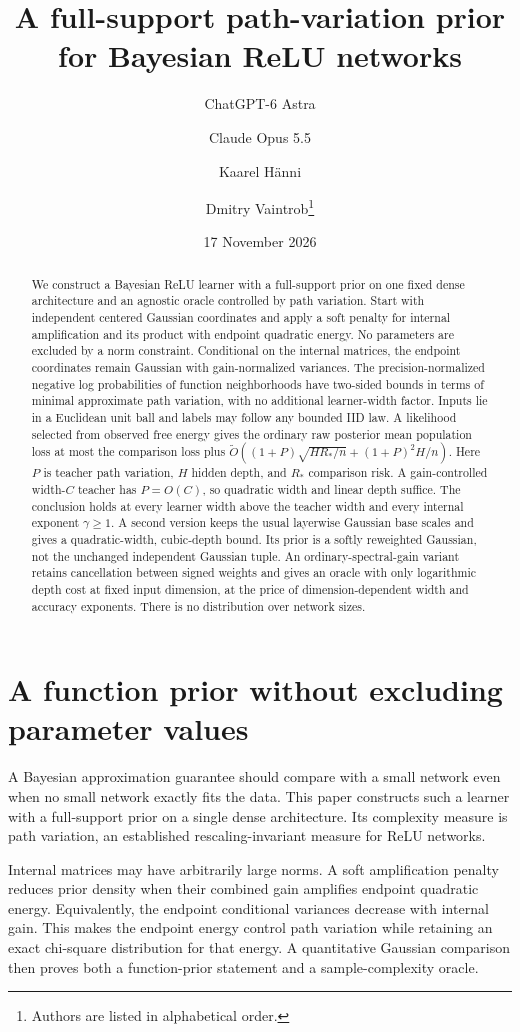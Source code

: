 \documentclass[11pt]{article}
\title{A full-support path-variation prior\\for Bayesian ReLU networks}
\author{ChatGPT-6 Astra \and Claude Opus 5.5 \and Kaarel H\"anni \and Dmitry Vaintrob\thanks{Authors are listed in alphabetical order.}}
\date{17 November 2026}
\theoremstyle{definition}\newtheorem{definition}[theorem]{Definition}
\theoremstyle{remark}\newtheorem{remark}[theorem]{Remark}
\begin{document}
\maketitle
\begin{abstract}
We construct a Bayesian ReLU learner with a full-support prior on one fixed dense architecture and an agnostic oracle controlled by path variation. Start with independent centered Gaussian coordinates and apply a soft penalty for internal amplification and its product with endpoint quadratic energy. No parameters are excluded by a norm constraint. Conditional on the internal matrices, the endpoint coordinates remain Gaussian with gain-normalized variances. The precision-normalized negative log probabilities of function neighborhoods have two-sided bounds in terms of minimal approximate path variation, with no additional learner-width factor. Inputs lie in a Euclidean unit ball and labels may follow any bounded IID law. A likelihood selected from observed free energy gives the ordinary raw posterior mean population loss at most the comparison loss plus $\widetilde O((1+P)\sqrt{HR_*/n}+(1+P)^2H/n)$. Here $P$ is teacher path variation, $H$ hidden depth, and $R_*$ comparison risk. A gain-controlled width-$C$ teacher has $P=O(C)$, so quadratic width and linear depth suffice. The conclusion holds at every learner width above the teacher width and every internal exponent $\gamma\ge1$. A second version keeps the usual layerwise Gaussian base scales and gives a quadratic-width, cubic-depth bound. Its prior is a softly reweighted Gaussian, not the unchanged independent Gaussian tuple. An ordinary-spectral-gain variant retains cancellation between signed weights and gives an oracle with only logarithmic depth cost at fixed input dimension, at the price of dimension-dependent width and accuracy exponents. There is no distribution over network sizes.
\end{abstract}

\section{A function prior without excluding parameter values}
A Bayesian approximation guarantee should compare with a small network even when no small network exactly fits the data. This paper constructs such a learner with a full-support prior on a single dense architecture. Its complexity measure is path variation, an established rescaling-invariant measure for ReLU networks.

Internal matrices may have arbitrarily large norms. A soft amplification penalty reduces prior density when their combined gain amplifies endpoint quadratic energy. Equivalently, the endpoint conditional variances decrease with internal gain. This makes the endpoint energy control path variation while retaining an exact chi-square distribution for that energy. A quantitative Gaussian comparison then proves both a function-prior statement and a sample-complexity oracle.
\end{document}
